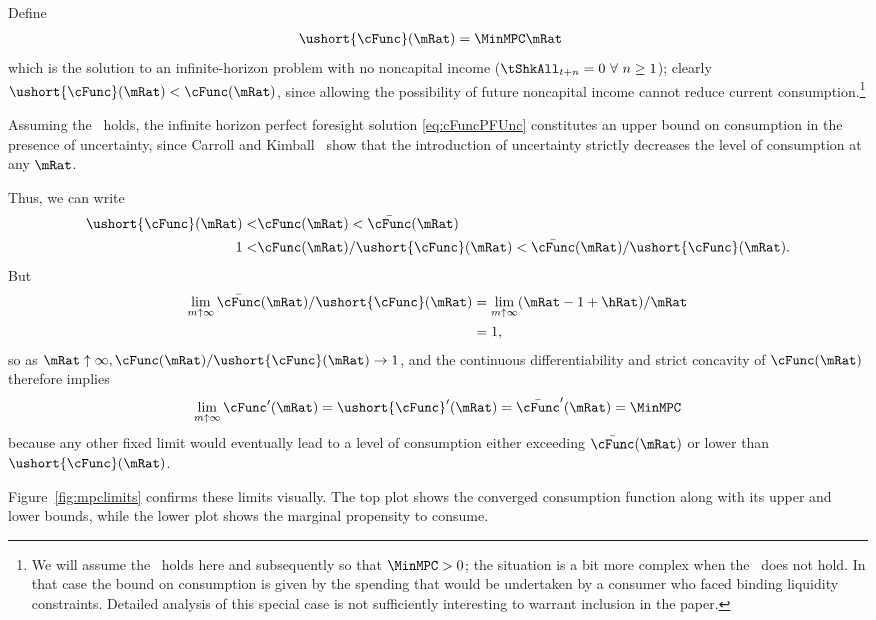 \documentclass[./BufferStockTheory.tex]{subfiles}
\begin{document}
Define
\begin{align}
   \ushort{\cFunc}(\mRat)  & = \MinMPC \mRat \nonumber
\end{align}
which is the solution to an infinite-horizon problem with no noncapital
income
($\tShkAll_{t+n} = 0~\forall~n\geq1$); 
  clearly $\ushort{\cFunc}(\mRat)
< \cFunc(\mRat)$, since allowing the possibility of future noncapital
income cannot reduce current consumption.\footnote{We will assume the
  \RIC~holds here and subsequently so that $\MinMPC > 0$; the situation
  is a bit more complex when the \RIC~does not hold.   In that case the bound on consumption is given by the spending
  that would be undertaken by a consumer who faced binding liquidity
  constraints.  Detailed analysis of this special case is not
  sufficiently interesting to warrant inclusion in the paper.}

Assuming the \FHWC~holds, the infinite horizon perfect
foresight solution \eqref{eq:cFuncPFUnc} constitutes an upper
bound on consumption in the presence of uncertainty, since Carroll and
Kimball~\citeyearpar{ckConcavity} show that the introduction of
uncertainty strictly decreases the level of consumption at any $\mRat$.

Thus, we can write
\begin{align}  
\ushort{\cFunc}(\mRat) < & \cFunc(\mRat)  < \bar{\cFunc}(\mRat) \label{eq:lowerltupper} \\
1 < & \cFunc(\mRat)/\ushort{\cFunc}(\mRat)  < \bar{\cFunc}(\mRat)/\ushort{\cFunc}(\mRat). \nonumber
\end{align}
But
\begin{align}  \label{eq:limitlowerupper}
\lim_{m \uparrow \infty} \bar{\cFunc}(\mRat)/\ushort{\cFunc}(\mRat) 
& = \lim_{m \uparrow \infty} (\mRat -1+ \hRat)/\mRat \nonumber \\
 & = 1, \nonumber
\end{align}
so as $\mRat \uparrow \infty, \cFunc(\mRat)/\ushort{\cFunc}(\mRat)
\rightarrow 1$, and the continuous differentiability and strict
concavity of $\cFunc(\mRat)$ therefore implies
\begin{equation}  \label{eq:limxtoinftycp}
\lim_{m \uparrow \infty} \cFunc^{\prime}(\mRat) =
\ushort{\cFunc}^{\prime}(\mRat) = \bar{\cFunc}^{\prime}(\mRat) = \MinMPC \notag
\end{equation}
because any other fixed limit would eventually lead to a level of
consumption either exceeding $\bar{\cFunc}(\mRat)$ or lower than
$\ushort{\cFunc}(\mRat)$.

Figure~\ref{fig:mpclimits} confirms these limits visually.  The top
plot shows the converged consumption function along with its upper and lower bounds,
while the lower plot shows the marginal propensity to consume.
\renewcommand{\figFile}{mpclimits}
\hypertarget{\figFile}{}

\end{document}
